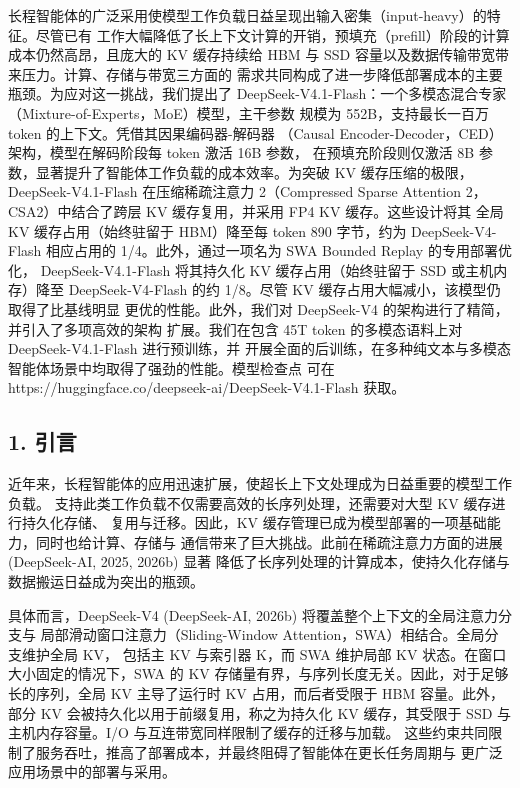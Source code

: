 长程智能体的广泛采用使模型工作负载日益呈现出输入密集（input-heavy）的特征。尽管已有
工作大幅降低了长上下文计算的开销，预填充（prefill）阶段的计算成本仍然高昂，且庞大的
KV 缓存持续给 HBM 与 SSD 容量以及数据传输带宽带来压力。计算、存储与带宽三方面的
需求共同构成了进一步降低部署成本的主要瓶颈。为应对这一挑战，我们提出了
DeepSeek-V4.1-Flash：一个多模态混合专家（Mixture-of-Experts，MoE）模型，主干参数
规模为 552B，支持最长一百万 token 的上下文。凭借其因果编码器-解码器
（Causal Encoder-Decoder，CED）架构，模型在解码阶段每 token 激活 16B 参数，
在预填充阶段则仅激活 8B 参数，显著提升了智能体工作负载的成本效率。为突破 KV
缓存压缩的极限，DeepSeek-V4.1-Flash 在压缩稀疏注意力 2（Compressed Sparse
Attention 2，CSA2）中结合了跨层 KV 缓存复用，并采用 FP4 KV 缓存。这些设计将其
全局 KV 缓存占用（始终驻留于 HBM）降至每 token 890 字节，约为 DeepSeek-V4-
Flash 相应占用的 1/4。此外，通过一项名为 SWA Bounded Replay 的专用部署优化，
DeepSeek-V4.1-Flash 将其持久化 KV 缓存占用（始终驻留于 SSD 或主机内存）降至
DeepSeek-V4-Flash 的约 1/8。尽管 KV 缓存占用大幅减小，该模型仍取得了比基线明显
更优的性能。此外，我们对 DeepSeek-V4 的架构进行了精简，并引入了多项高效的架构
扩展。我们在包含 45T token 的多模态语料上对 DeepSeek-V4.1-Flash 进行预训练，并
开展全面的后训练，在多种纯文本与多模态智能体场景中均取得了强劲的性能。模型检查点
可在 https://huggingface.co/deepseek-ai/DeepSeek-V4.1-Flash 获取。

\subsection{1. 引言}\label{introduction}

近年来，长程智能体的应用迅速扩展，使超长上下文处理成为日益重要的模型工作负载。
支持此类工作负载不仅需要高效的长序列处理，还需要对大型 KV 缓存进行持久化存储、
复用与迁移。因此，KV 缓存管理已成为模型部署的一项基础能力，同时也给计算、存储与
通信带来了巨大挑战。此前在稀疏注意力方面的进展 (DeepSeek-AI, 2025, 2026b) 显著
降低了长序列处理的计算成本，使持久化存储与数据搬运日益成为突出的瓶颈。

具体而言，DeepSeek-V4 (DeepSeek-AI, 2026b) 将覆盖整个上下文的全局注意力分支与
局部滑动窗口注意力（Sliding-Window Attention，SWA）相结合。全局分支维护全局 KV，
包括主 KV 与索引器 K，而 SWA 维护局部 KV 状态。在窗口大小固定的情况下，SWA 的
KV 存储量有界，与序列长度无关。因此，对于足够长的序列，全局 KV 主导了运行时 KV
占用，而后者受限于 HBM 容量。此外，部分 KV 会被持久化以用于前缀复用，称之为持久化
KV 缓存，其受限于 SSD 与主机内存容量。I/O 与互连带宽同样限制了缓存的迁移与加载。
这些约束共同限制了服务吞吐，推高了部署成本，并最终阻碍了智能体在更长任务周期与
更广泛应用场景中的部署与采用。

